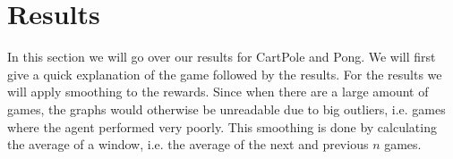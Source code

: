 \documentclass{article}
\begin{document}
%




\section{Results}
In this section we will go over our results for CartPole and Pong. We will first give a quick explanation of the game followed by the results. For the results we will apply smoothing to the rewards. Since when there are a large amount of games, the graphs would otherwise be unreadable due to big outliers, i.e. games where the agent performed very poorly. This smoothing is done by calculating the average of a window, i.e. the average of the next and previous $n$ games.
\end{document}
